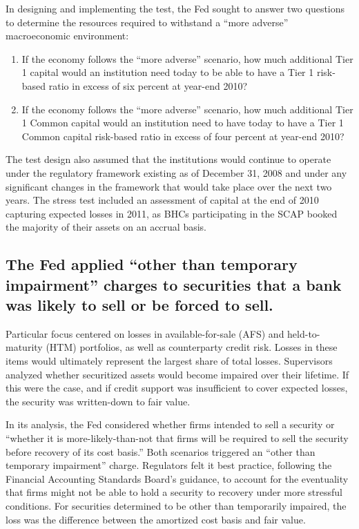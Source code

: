 \documentclass[justified, nobib]{tufte-handout2}
\begin{document}
In designing and implementing the test, the Fed sought to answer two
questions to determine the resources required to withstand a ``more
adverse'' macroeconomic environment:

\begin{enumerate}
\def\labelenumi{\arabic{enumi}.}
\item
  If the economy follows the ``more adverse'' scenario, how much
  additional Tier 1 capital would an institution need today to be able
  to have a Tier 1 risk-based ratio in excess of six percent at year-end
  2010?
\item
  If the economy follows the ``more adverse'' scenario, how much
  additional Tier 1 Common capital would an institution need to have
  today to have a Tier 1 Common capital risk-based ratio in excess of
  four percent at year-end 2010?
\end{enumerate}

The test design also assumed that the institutions would continue to
operate under the regulatory framework existing as of December 31, 2008
and under any significant changes in the framework that would take place
over the next two years. The stress test included an assessment of
capital at the end of 2010 capturing expected losses in 2011, as BHCs
participating in the SCAP booked the majority of their assets on an
accrual basis.\citep{Design}

\subsection{The Fed applied ``other than temporary impairment'' charges to
securities that a bank was likely to sell or be forced to
sell.}

Particular focus centered on losses in available-for-sale (AFS) and
held-to-maturity (HTM) portfolios, as well as counterparty credit risk.
Losses in these items would ultimately represent the largest share of
total losses. Supervisors analyzed whether securitized assets would
become impaired over their lifetime. If this were the case, and if
credit support was insufficient to cover expected losses, the security
was written-down to fair value.

In its analysis, the Fed considered whether firms intended to sell a
security or ``whether it is more-likely-than-not that firms will be
required to sell the security before recovery of its cost basis.'' Both
scenarios triggered an ``other than temporary impairment'' charge.
Regulators felt it best practice, following the Financial Accounting
Standards Board's guidance, to account for the eventuality that firms
might not be able to hold a security to recovery under more stressful
conditions. For securities determined to be other than temporarily
impaired, the loss was the difference between the amortized cost basis
and fair value.\citep{Results}
\end{document}
